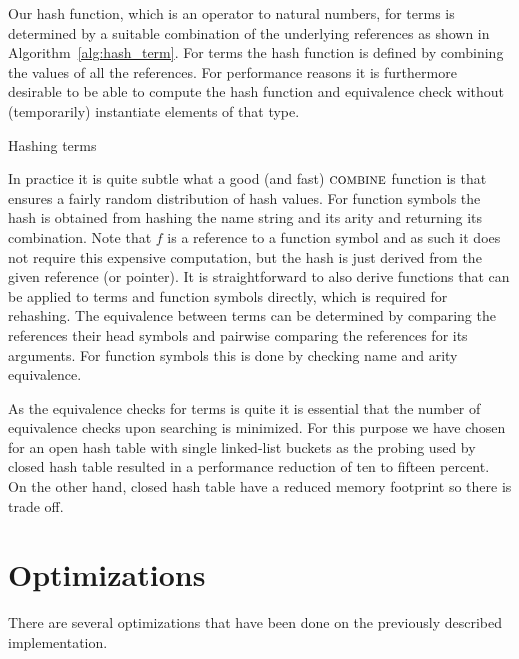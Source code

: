 \documentclass[10pt,a4paper]{article}
\theoremstyle{definition}
\renewcommand{\gets}{:=}
\begin{document}
Our hash function, which is an operator to natural numbers, for terms is determined by a suitable combination of the underlying references as shown in Algorithm~\ref{alg:hash_term}.
For terms the hash function is defined by combining the values of all the references.
For performance reasons it is furthermore desirable to be able to compute the hash function and equivalence check without (temporarily) instantiate elements of that type.

\begin{algorithm}[H]
 \caption{Hashing terms}\label{alg:hash_term}
 \begin{algorithmic}[1]
  \State {$\hnr \gets \hash(f)$}
    \State {$\hnr \gets \combine(\hnr, t)$}
  \EndFor 
  \EndProcedure
\end{algorithmic}
\end{algorithm}

\noindent In practice it is quite subtle what a good (and fast) $\textsc{combine}$ function is that ensures a fairly random distribution of hash values.
For function symbols the hash is obtained from hashing the name string and its arity and returning its combination.
Note that $f$ is a reference to a function symbol and as such it does not require this expensive computation, but the hash is just derived from the given reference (or pointer).
It is straightforward to also derive functions that can be applied to terms and function symbols directly, which is required for rehashing.
The equivalence between terms can be determined by comparing the references their head symbols and pairwise comparing the references for its arguments.
For function symbols this is done by checking name and arity equivalence.

As the equivalence checks for terms is quite it is essential that the number of equivalence checks upon searching is minimized.
For this purpose we have chosen for an open hash table with single linked-list buckets as the probing used by closed hash table resulted in a performance reduction of ten to fifteen percent.
On the other hand, closed hash table have a reduced memory footprint so there is trade off.

\section{Optimizations}\label{section:optimizations}

There are several optimizations that have been done on the previously described implementation.
\end{document}
